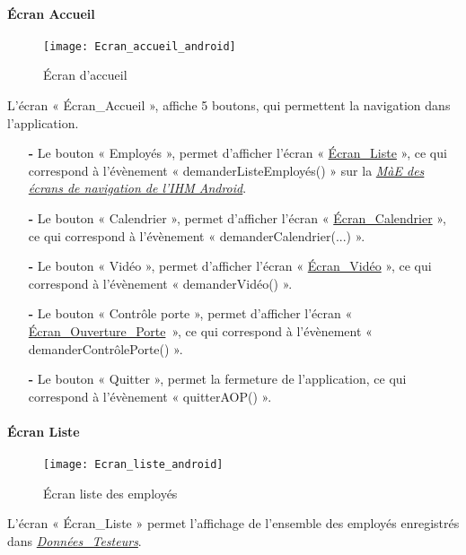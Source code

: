 \paragraph{Écran Accueil}
\hypertarget{EcranAccueil}{}

\begin{figure} [H]
    \centering
    \texttt{[image: Ecran\_accueil\_android]}
    \caption{Écran d'accueil}
    \label{Ecran d'accueil}
\end{figure}

L’écran « Écran\_Accueil », affiche 5 boutons, qui permettent la navigation dans l’application.
\begin{itemize}
    \item[\textbf{-}]	Le bouton « Employés », permet d’afficher l’écran « \hyperlink{EcranListe}{Écran\_Liste} », ce qui correspond à l'évènement « demanderListeEmployés() » sur la \hyperlink{MaEHome}{\textit{MàE des écrans de navigation de l’IHM Android}}.  
    \item[\textbf{-}]	Le bouton « Calendrier », permet d’afficher l’écran « \hyperlink{EcranCalendrier}{Écran\_Calendrier} », ce qui correspond à l'évènement « demanderCalendrier(...) ».
    \item[\textbf{-}]	Le bouton « Vidéo », permet d’afficher l’écran « \hyperlink{EcranVideo}{Écran\_Vidéo} », ce qui correspond à l'évènement « demanderVidéo() ».
    \item[\textbf{-}]	Le bouton « Contrôle porte », permet d’afficher l’écran « \hyperlink{EcranPorte}{Écran\_Ouverture\_Porte}~», ce qui correspond à l'évènement « demanderContrôlePorte() ».
    \item[\textbf{-}]	Le bouton « Quitter », permet la fermeture de l’application, ce qui correspond à l'évènement « quitterAOP() ».
\end{itemize}

\paragraph{Écran Liste}
\hypertarget{EcranListe}{}

\begin{figure} [H]
    \centering
    \texttt{[image: Ecran\_liste\_android]}
    \caption{Écran liste des employés}
    \label{Écran liste des employés}
\end{figure}


L’écran « Écran\_Liste » permet l’affichage de l’ensemble des employés enregistrés dans \hyperlink{donneesTesteurs}{\textit{Données\_Testeurs}}.

